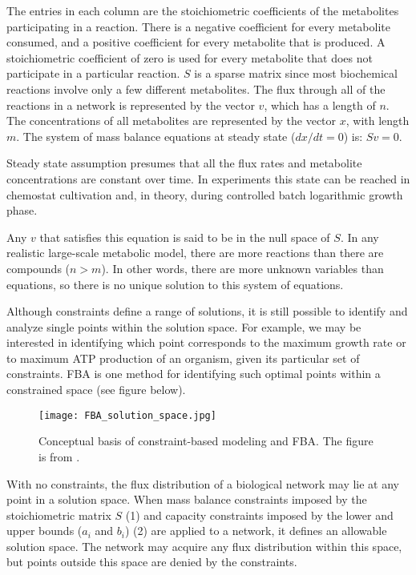 The entries in each column are the stoichiometric coefficients 
of the metabolites participating in a reaction. There is a negative coefficient 
for every metabolite consumed, and a positive coefficient for every metabolite 
that is produced. A stoichiometric coefficient of zero is used for every 
metabolite that does not participate in a particular reaction. $S$ is a sparse 
matrix since most biochemical reactions involve only a few different metabolites. 
The flux through all of the reactions in a network is represented by the vector 
$v$, which has a length of $n$. The concentrations of all metabolites are represented
by the vector $x$, with length $m$. The system of mass balance equations at steady 
state ($dx/dt = 0$) is: $Sv = 0$. \cite{Orth2010}

Steady state assumption presumes that all the flux rates and metabolite concentrations are constant over time. In experiments this state can be
reached in chemostat cultivation and, in theory, during controlled batch logarithmic growth
phase. \cite{Kerkhoven2014} 

Any $v$ that satisfies this equation is said to be in the null space of $S$. In any realistic 
large-scale metabolic model, there are more reactions than there are compounds ($n > m$). In other words, 
there are more unknown variables than equations, so there is no unique solution to this system of equations. \cite{Orth2010}

Although constraints define a range of solutions, it is still possible to identify
and analyze single points within the solution space. For example, we may be 
interested in identifying which point corresponds to the maximum growth rate 
or to maximum ATP production of an organism, given its particular set of 
constraints. FBA is one method for identifying such optimal points within a 
constrained space (see figure below). 

\begin{figure}[h]
    \texttt{[image: FBA\_solution\_space.jpg]}
    \caption{Conceptual basis of constraint-based modeling and FBA. The figure is from \cite{Orth2010}.}
    \label{Solution space}
\end{figure}

With no constraints, the flux distribution of a 
biological network may lie at any point in a solution space. When mass balance constraints 
imposed by the stoichiometric matrix $S$ (1) and capacity constraints imposed by the lower and upper 
bounds ($a_i$ and $b_i$) (2) are applied to a network, it defines an allowable solution space. The network 
may acquire any flux distribution within this space, but points outside this space are denied by the 
constraints. 

